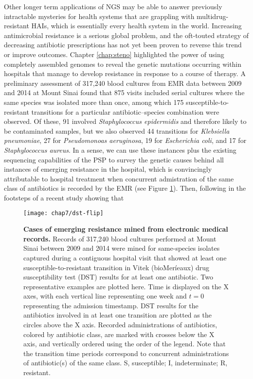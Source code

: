 Other longer term applications of NGS may be able to answer previously intractable mysteries for health systems that are grappling with multidrug-resistant HAIs, which is essentially every health system in the world. Increasing antimicrobial resistance is a serious global problem, and the oft-touted strategy of decreasing antibiotic prescriptions has not yet been proven to reverse this trend or improve outcomes.\autocite{Policy2010,Wagner2014} Chapter \ref{chap:steno} highlighted the power of using completely assembled genomes to reveal the genetic mutations occurring within hospitals that manage to develop resistance in response to a course of therapy. A preliminary assessment of 317,240 blood cultures from EMR data between 2009 and 2014 at Mount Sinai found that 875 visits included serial cultures where the same species was isolated more than once, among which 175 susceptible-to-resistant transitions for a particular antibiotic–species combination were observed. Of these, 91 involved \emph{Staphylococcus epidermidis} and therefore likely to be contaminated samples, but we also observed 44 transitions for \emph{Klebsiella pneumoniae}, 27 for \emph{Pseudomonoas aeruginosa}, 19 for \emph{Escherichia coli}, and 17 for \emph{Staphylococcus aureus}. In a sense, we can use these instances plus the existing sequencing capabilities of the PSP to survey the genetic causes behind all instances of emerging resistance in the hospital, which is convincingly attributable to hospital treatment when concurrent admistration of the same class of antibiotics is recorded by the EMR (see Figure \ref{fig:dst_flip}). Then, following in the footsteps of a recent study showing that 
\begin{figure}[htb]
  \centering
  \texttt{[image: chap7/dst-flip]}
  \caption[Cases of emerging resistance mined from electronic medical records]{\textbf{Cases of emerging resistance mined from electronic medical records.} Records of 317,240 blood cultures performed at Mount Sinai between 2009 and 2014 were mined for same-species isolates captured during a contiguous hospital visit that showed at least one susceptible-to-resistant transition in Vitek (bioMeríeaux) drug susceptibility test (DST) results for at least one antibiotic. Two representative examples are plotted here. Time is displayed on the X axes, with each vertical line representing one week and $t=0$ representing the admission timestamp. DST results for the antibiotics involved in at least one transition are plotted as the circles above the X axis. Recorded administrations of antibiotics, colored by antibiotic class, are marked with crosses below the X axis, and vertically ordered using the order of the legend. Note that the transition time periods correspond to concurrent administrations of antibiotic(s) of the same class. S, susceptible; I, indeterminate; R, resistant.
  }
  \label{fig:dst_flip}
\end{figure}
